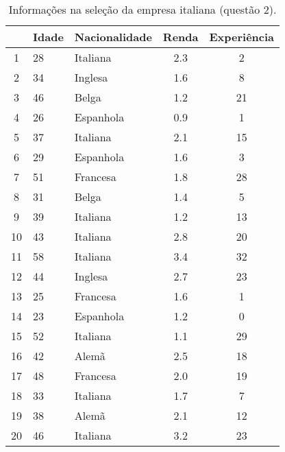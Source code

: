 \documentclass[a4paper,11pt]{article}
\begin{document}
\begin{table}[H]
    \centering
    \label{tab_2}
    \begin{tabular}{c l l c c}
        \toprule
         & \textbf{Idade} & \textbf{Nacionalidade} & \textbf{Renda} & \textbf{Experiência} \\
        \midrule
        1 & 28 & Italiana & 2.3 & 2 \\
        2 & 34 & Inglesa & 1.6 & 8 \\
        3 & 46 & Belga & 1.2 & 21 \\
        4 & 26 & Espanhola & 0.9 & 1 \\
        5 & 37 & Italiana & 2.1 & 15 \\
        6 & 29 & Espanhola & 1.6 & 3 \\
        7 & 51 & Francesa & 1.8 & 28 \\
        8 & 31 & Belga & 1.4 & 5 \\
        9 & 39 & Italiana & 1.2 & 13 \\
        10 & 43 & Italiana & 2.8 & 20 \\
        11 & 58 & Italiana & 3.4 & 32 \\
        12 & 44 & Inglesa & 2.7 & 23 \\
        13 & 25 & Francesa & 1.6 & 1 \\
        14 & 23 & Espanhola & 1.2 & 0 \\
        15 & 52 & Italiana & 1.1 & 29 \\
        16 & 42 & Alemã & 2.5 & 18 \\
        17 & 48 & Francesa & 2.0 & 19 \\
        18 & 33 & Italiana & 1.7 & 7 \\
        19 & 38 & Alemã & 2.1 & 12 \\
        20 & 46 & Italiana & 3.2 & 23 \\
        \bottomrule
    \end{tabular}
        \caption{Informações na seleção da empresa italiana (questão 2).}
\end{table}
\end{document}
